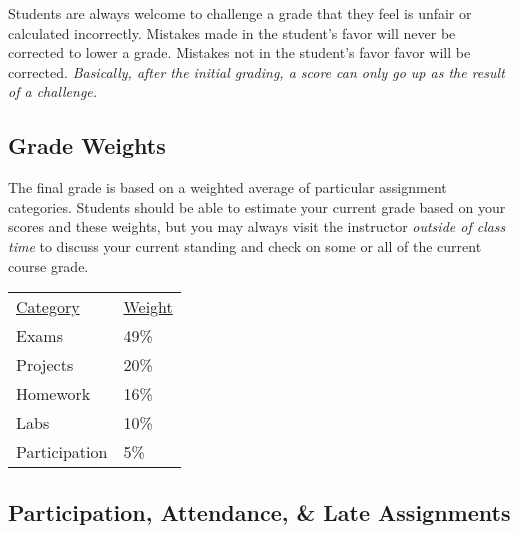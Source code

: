 \documentclass[10pt]{article}
\begin{document}
Students are always welcome to challenge a grade that they feel is unfair or calculated incorrectly.  Mistakes made in the student's favor will never be corrected to lower a grade.  Mistakes not in the student's favor favor will be corrected.  \textit{Basically, after the initial grading, a score can only go up as the result of a challenge.}



\subsection{Grade Weights}

The final grade is based on a weighted average of particular assignment categories.  Students should be able to estimate your current grade based on your scores and these weights, but you may always visit the instructor \textit{outside of class time} to discuss your current standing and check on some or all of the current course grade.

\begin{center}
  \begin{tabular}{ll}
  \underline{Category} & \underline{Weight} \\
    Exams & 49\% \\ %
    Projects & 20\% \\ %
    Homework & 16\% \\ %
    Labs & 10\% \\ %
    Participation & 5\%
  \end{tabular}
\end{center}

\subsection{Participation, Attendance, \& Late Assignments}

\end{document}
